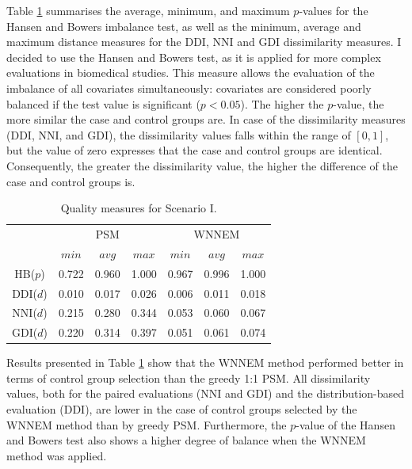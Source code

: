 		Table \ref{tab:wnnem_scen_I_stat} summarises the average, minimum, and maximum $p$-values for the Hansen and Bowers imbalance test, as well as the minimum, average and maximum distance measures for the DDI, NNI and GDI dissimilarity measures. I decided to use the Hansen and Bowers test, as it is applied for more complex evaluations in biomedical studies. This measure allows the evaluation of the imbalance of all covariates simultaneously: covariates are considered poorly balanced if the test value is significant ($p<0.05$). The higher the $p$-value, the more similar the case and control groups are. In case of the dissimilarity measures (DDI, NNI, and GDI), the dissimilarity values falls within the range of $[0,1]$, but the value of zero expresses that the case and control groups are identical. Consequently, the greater the dissimilarity value, the higher the difference of the case and control groups is.
										
		\begin{table}[h]
			\caption{Quality measures for Scenario I.%
			}
			\label{tab:wnnem_scen_I_stat}
			\centering
			\begin{tabular}{ccccccc} 
				\toprule
				& \multicolumn{3}{c}{PSM} 
				& \multicolumn{3}{c}{WNNEM}\\
				         & $min$ & $avg$ & $max$ & $min$ & $avg$ & $max$ \\
				\midrule
				HB($p$)  & 0.722 & 0.960 & 1.000 & 0.967 & 0.996 & 1.000 \\
				DDI($d$) & 0.010 & 0.017 & 0.026 & 0.006 & 0.011 & 0.018 \\
				\midrule
				NNI($d$) & 0.215 & 0.280 & 0.344 & 0.053 & 0.060 & 0.067 \\
				GDI($d$) & 0.220 & 0.314 & 0.397 & 0.051 & 0.061 & 0.074 \\
				\bottomrule
			\end{tabular}
		\end{table}
										
		Results presented in Table \ref{tab:wnnem_scen_I_stat} show that the WNNEM method performed better in terms of control group selection than the greedy 1:1 PSM. All dissimilarity values, both for the paired evaluations (NNI and GDI) and the distribution-based evaluation (DDI), are lower in the case of control groups selected by the WNNEM method than by greedy PSM. Furthermore, the $p$-value of the Hansen and Bowers test also shows a higher degree of balance when the WNNEM method was applied. 
										

